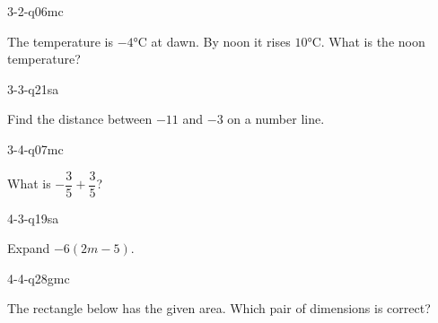 \begin{practiceQuestion}{3-2-q06}{mc}
\begin{questionText}
The temperature is $-4°$C at dawn. By noon it rises $10°$C. What is the noon temperature?
\end{questionText}
\end{practiceQuestion}

\begin{practiceQuestion}{3-3-q21}{sa}
\begin{questionText}
Find the distance between $-11$ and $-3$ on a number line.
\end{questionText}
\end{practiceQuestion}

\begin{practiceQuestion}{3-4-q07}{mc}
\begin{questionText}
What is $-\dfrac{3}{5} + \dfrac{3}{5}$?
\end{questionText}
\end{practiceQuestion}

\begin{practiceQuestion}{4-3-q19}{sa}
\begin{questionText}
Expand $-6(2m - 5)$.
\end{questionText}
\end{practiceQuestion}

\begin{practiceQuestion}{4-4-q28}{gmc}
\begin{questionText}
The rectangle below has the given area. Which pair of dimensions is correct?

\begin{center}
\end{center}
\end{questionText}
\end{practiceQuestion}

